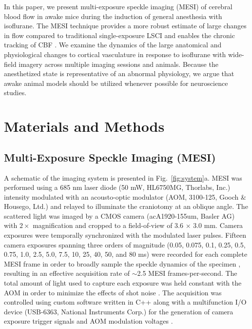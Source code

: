 \documentclass[review]{elsarticle}
\begin{document}
In this paper, we present multi-exposure speckle imaging (MESI) of cerebral blood flow in awake mice during the induction of general anesthesia with isoflurane. The MESI technique \cite{Parthasarathy:2008el} provides a more robust estimate of large changes in flow compared to traditional single-exposure LSCI \cite{Parthasarathy:2010vo} and enables the chronic tracking of CBF \cite{Kazmi:2013hp}. We examine the dynamics of the large anatomical and physiological changes to cortical vasculature in response to isoflurane with wide-field imagery across multiple imaging sessions and animals. Because the anesthetized state is representative of an abnormal physiology, we argue that awake animal models should be utilized whenever possible for neuroscience studies.


\section{Materials and Methods}

\subsection{Multi-Exposure Speckle Imaging (MESI)}
A schematic of the imaging system is presented in Fig.~\ref{fig:system}a. MESI was performed using a 685 nm laser diode (50 mW, HL6750MG, Thorlabs, Inc.) intensity modulated with an acousto-optic modulator (AOM, 3100-125, Gooch \& Housego, Ltd.) and relayed to illuminate the craniotomy at an oblique angle. The scattered light was imaged by a CMOS camera (acA1920-155um, Basler AG) with $2\times$ magnification and cropped to a field-of-view of 3.6 $\times$ 3.0 mm. Camera exposures were temporally synchronized with the modulated laser pulses. Fifteen camera exposures spanning three orders of magnitude (0.05, 0.075, 0.1, 0.25, 0.5, 0.75, 1.0, 2.5, 5.0, 7.5, 10, 25, 40, 50, and 80 ms) \cite{Parthasarathy:2008el,Atchia:2013ep,Kazmi:2013hp} were recorded for each complete MESI frame in order to broadly sample the speckle dynamics of the specimen \cite{Kazmi:2014go}, resulting in an effective acquisition rate of $\sim$2.5 MESI frames-per-second. The total amount of light used to capture each exposure was held constant with the AOM in order to minimize the effects of shot noise \cite{Parthasarathy:2008el}. The acquisition was controlled using custom software written in C++ along with a multifunction I/O device (USB-6363, National Instruments Corp.) for the generation of camera exposure trigger signals and AOM modulation voltages \cite{Sullender:2018ff}.
\end{document}
